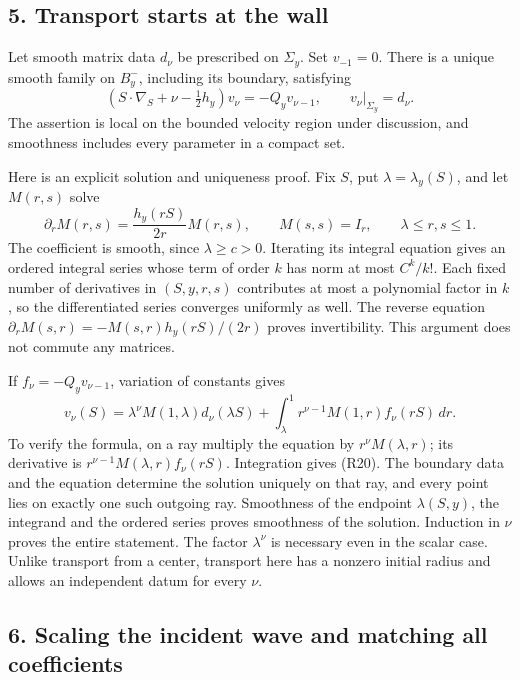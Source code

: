 \documentclass[
  11pt,
]{article}
\begin{document}
\subsection{5. Transport starts at the
wall}\label{transport-starts-at-the-wall}

Let smooth matrix data \(d_\nu\) be prescribed on \(\Sigma_y\). Set
\(v_{-1}=0\). There is a unique smooth family on \(B_y^-\), including
its boundary, satisfying \[
 (S\cdot\nabla_S+\nu-\tfrac12h_y)v_\nu=-Q_yv_{\nu-1},
 \qquad v_\nu|_{\Sigma_y}=d_\nu.                             \tag{R18}
\] The assertion is local on the bounded velocity region under
discussion, and smoothness includes every parameter in a compact set.

Here is an explicit solution and uniqueness proof. Fix \(S\), put
\(\lambda=\lambda_y(S)\), and let \(M(r,s)\) solve \[
 \partial_rM(r,s)=\frac{h_y(rS)}{2r}M(r,s),\qquad M(s,s)=I_r,
 \qquad \lambda\leq r,s\leq1.                               \tag{R19}
\] The coefficient is smooth, since \(\lambda\geq c>0\). Iterating its
integral equation gives an ordered integral series whose term of order
\(k\) has norm at most \(C^k/k!\). Each fixed number of derivatives in
\((S,y,r,s)\) contributes at most a polynomial factor in \(k\), so the
differentiated series converges uniformly as well. The reverse equation
\(\partial_rM(s,r)=-M(s,r)h_y(rS)/(2r)\) proves invertibility. This
argument does not commute any matrices.

If \(f_\nu=-Q_yv_{\nu-1}\), variation of constants gives \[
 v_\nu(S)=\lambda^\nu M(1,\lambda)d_\nu(\lambda S)
     +\int_\lambda^1r^{\nu-1}M(1,r)f_\nu(rS)\,dr.             \tag{R20}
\] To verify the formula, on a ray multiply the equation by
\(r^\nu M(\lambda,r)\); its derivative is
\(r^{\nu-1}M(\lambda,r)f_\nu(rS)\). Integration gives (R20). The
boundary data and the equation determine the solution uniquely on that
ray, and every point lies on exactly one such outgoing ray. Smoothness
of the endpoint \(\lambda(S,y)\), the integrand and the ordered series
proves smoothness of the solution. Induction in \(\nu\) proves the
entire statement. The factor \(\lambda^\nu\) is necessary even in the
scalar case. Unlike transport from a center, transport here has a
nonzero initial radius and allows an independent datum for every
\(\nu\).

\subsection{6. Scaling the incident wave and matching all
coefficients}\label{scaling-the-incident-wave-and-matching-all-coefficients}
\end{document}
